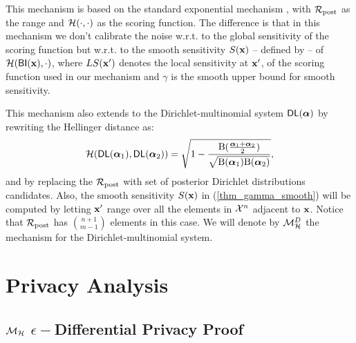 \documentclass{article}
\begin{document}
This mechanism is based on the standard exponential mechanism
\cite{talwar}, with $\mathcal{R}_{\textup{post}}$ as the range and
$\mathcal{H}(\cdot,\cdot)$ as the scoring function. The difference is
that in this mechanism we don't calibrate the noise w.r.t. to the
global sensitivity of the scoring function but w.r.t. to the smooth
sensitivity $S(\textbf{x})$ -- defined by \cite{nissim2007smooth}-- of
$\mathcal{H}(\mathsf{BI}(\textbf{x}), \cdot)$, where $LS(\textbf{x}')$ denotes the local
sensitivity at $\textbf{x}'$, of the scoring function used in our mechanism and  $\gamma$ is the smooth upper bound for smooth sensitivity.

This mechanism also extends to the Dirichlet-multinomial system $\mathsf{DL}(\boldsymbol{\alpha})$ by rewriting the Hellinger distance as:
\[
  \mathcal{H}(\mathsf{DL}(\boldsymbol{\alpha}_1), \mathsf{DL}(\boldsymbol{\alpha}_2)) = \sqrt{1 - \frac{\textup{B}(\frac{\boldsymbol{\alpha}_1 + \boldsymbol{\alpha}_2}{2})}{\sqrt{\textup{B}(\boldsymbol{\alpha}_1) \textup{B}(\boldsymbol{\alpha}_2)}}},
\]
and by replacing the $\mathcal{R}_{\textup{post}}$ with set of posterior Dirichlet
distributions candidates. Also, the smooth sensitivity $S(\textbf{x})$
in (\ref{thm_gamma_smooth}) will be computed by letting $\textbf{x}'$ range
over all the elements in $\mathcal{X}^{n}$ adjacent to $\textbf{x}$. Notice
that $\mathcal{R}_{\textup{post}}$ has $\binom{n + 1}{m - 1}$ elements in this case. We
will denote by $\mathcal{M}^{D}_{\mathcal{H}}$ the mechanism for the
Dirichlet-multinomial system.








\section{Privacy Analysis}



\subsection{$\mathcal{M}_{\mathcal{H}}$ $\epsilon-$Differential Privacy Proof}
\end{document}
